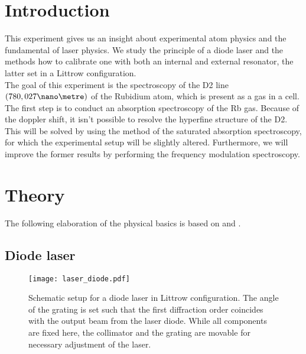 
\section{Introduction}
This experiment gives us an insight about experimental atom physics and the fundamental of laser physics. We study the principle of a diode laser and the methods how to calibrate one with both an internal and external resonator, the latter set in a Littrow configuration.\\
The goal of this experiment is the spectroscopy of the D2 line $(780,027 \nano\metre)$ of the Rubidium atom, which is present as a gas in a cell.\\
The first step is to conduct an absorption spectroscopy of the Rb gas. Because of the doppler shift, it isn't possible to resolve the hyperfine structure of the D2. This will be solved by using the method of the saturated absorption spectroscopy, for which the experimental setup will be slightly altered. Furthermore, we will improve the former results by performing the frequency modulation spectroscopy.

\newpage
\section{Theory}
The following elaboration of the physical basics is based on  \cite{lit:AK_manual2012} and \cite{lit:SAS}.

\subsection{Diode laser}
\begin{figure}[bh]
	\centering
	\texttt{[image: laser\_diode.pdf]}
	\caption[Schematic of a diode laser in Littrow configuration]{Schematic setup for a diode laser in Littrow configuration. The angle of the grating is set such that the first diffraction order coincides with the output beam from the laser diode. While all components are fixed here, the collimator and the grating are movable for necessary adjustment of the laser.}
	\label{fig:laser_diode}
\end{figure}

